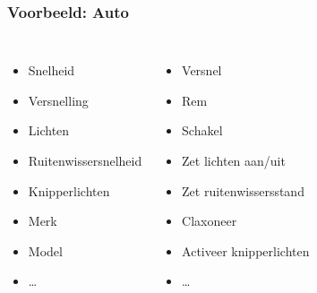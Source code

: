 \begin{frame}
  \frametitle{Voorbeeld: Auto}
  \begin{center}
  \end{center}
  \begin{columns}[t]
    \begin{itemize}
      \item<1-> Snelheid
      \item<4-> Versnelling
      \item<5-> Lichten
      \item<6-> Ruitenwissersnelheid
      \item<6-> Knipperlichten
      \item<6-> Merk
      \item<6-> Model
      \item<6-> \dots
    \end{itemize}

    \begin{itemize}
      \item<2-> Versnel
      \item<3-> Rem
      \item<4-> Schakel
      \item<5-> Zet lichten aan/uit
      \item<6-> Zet ruitenwissersstand
      \item<6-> Claxoneer
      \item<6-> Activeer knipperlichten
      \item<6-> \dots
    \end{itemize}
  \end{columns}
\end{frame}

